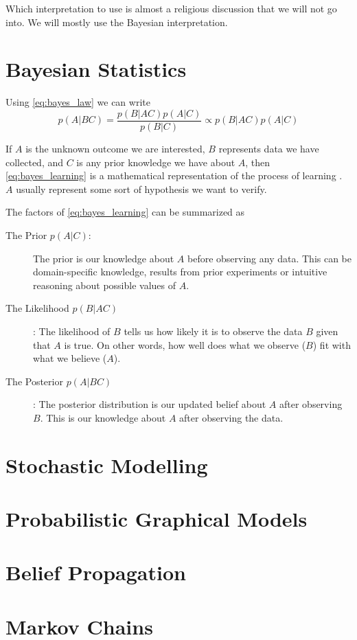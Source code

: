 Which interpretation to use is almost a religious discussion that we will not go into. We will mostly use the Bayesian interpretation.





\section{Bayesian Statistics}

Using \cref{eq:bayes_law} we can write 
\begin{equation}\label{eq:bayes_learning}
    p(A|BC) = \frac{p(B | AC) p(A | C)}{p(B | C)} \propto p(B | AC)p(A | C)
\end{equation}

If $A$ is the unknown outcome we are interested, $B$ represents data we have collected, and $C$ is any prior knowledge we have about $A$, then \cref{eq:bayes_learning} is a mathematical representation of the process of learning \cite{Jaynes86bayesianmethods:}. $A$ usually represent some sort of hypothesis we want to verify. 

The factors of \cref{eq:bayes_learning} can be summarized as
\begin{description}
    \item[The Prior $p(A | C)$:] The prior is our knowledge about $A$ before observing any data. This can be domain-specific knowledge, results from prior experiments or intuitive reasoning about possible values of $A$. 
    \item[The Likelihood $p(B | AC)$]: The likelihood of $B$ tells us how likely it is to observe the data $B$ given that $A$ is true. On other words, how well does what we observe ($B$) fit with what we believe ($A$). 
    \item[The Posterior $p(A | BC)$]: The posterior distribution is our updated belief about $A$ after observing $B$. This is our knowledge about $A$ after observing the data. 
\end{description}

\section{Stochastic Modelling}

\section{Probabilistic Graphical Models}

\section{Belief Propagation}

\section{Markov Chains}

